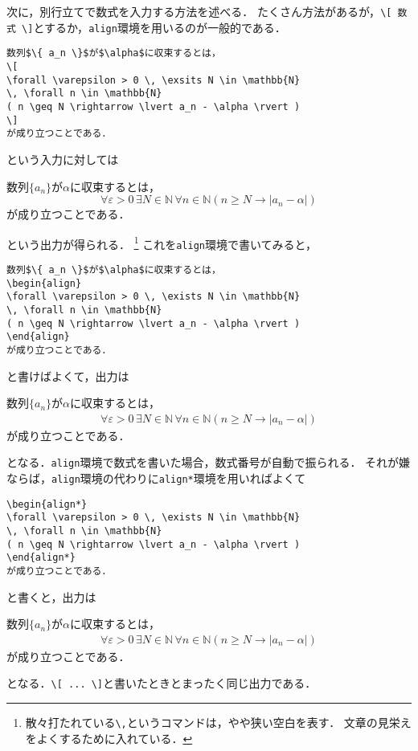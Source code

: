 次に，別行立てで数式を入力する方法を述べる．
たくさん方法があるが，\verb|\[ 数式 \]|とするか，\texttt{align}環境を用いるのが一般的である．
\begin{verbatim}
数列$\{ a_n \}$が$\alpha$に収束するとは，
\[
\forall \varepsilon > 0 \, \exsits N \in \mathbb{N} 
\, \forall n \in \mathbb{N} 
( n \geq N \rightarrow \lvert a_n - \alpha \rvert )
\]
が成り立つことである．
\end{verbatim}
という入力に対しては
\begin{oframed}
数列$\{ a_n \}$が$\alpha$に収束するとは，
\[
\forall \varepsilon > 0 \, \exists N \in \mathbb{N} 
\, \forall n \in \mathbb{N} 
( n \geq N \rightarrow \lvert a_n - \alpha \rvert )
\]
が成り立つことである．
\end{oframed}
という出力が得られる．
\footnote{散々打たれている\verb|\,|というコマンドは，やや狭い空白を表す．
文章の見栄えをよくするために入れている．}
これを\texttt{align}環境で書いてみると，
\begin{verbatim}
数列$\{ a_n \}$が$\alpha$に収束するとは，
\begin{align}
\forall \varepsilon > 0 \, \exists N \in \mathbb{N} 
\, \forall n \in \mathbb{N} 
( n \geq N \rightarrow \lvert a_n - \alpha \rvert )
\end{align}
が成り立つことである．
\end{verbatim}
と書けばよくて，出力は
\begin{oframed}
数列$\{ a_n \}$が$\alpha$に収束するとは，
\begin{align}
\forall \varepsilon > 0 \, \exists N \in \mathbb{N} 
\, \forall n \in \mathbb{N} 
( n \geq N \rightarrow \lvert a_n - \alpha \rvert )
\end{align}
が成り立つことである．
\end{oframed}
となる．\texttt{align}環境で数式を書いた場合，数式番号が自動で振られる．
それが嫌ならば，\texttt{align}環境の代わりに\texttt{align*}環境を用いればよくて
\begin{verbatim}
\begin{align*}
\forall \varepsilon > 0 \, \exists N \in \mathbb{N} 
\, \forall n \in \mathbb{N} 
( n \geq N \rightarrow \lvert a_n - \alpha \rvert )
\end{align*}
が成り立つことである．
\end{verbatim}
と書くと，出力は
\begin{oframed}
数列$\{ a_n \}$が$\alpha$に収束するとは，
\begin{align*}
\forall \varepsilon > 0 \, \exists N \in \mathbb{N} 
\, \forall n \in \mathbb{N} 
( n \geq N \rightarrow \lvert a_n - \alpha \rvert )
\end{align*}
が成り立つことである．
\end{oframed}
となる．\verb|\[ ... \]|と書いたときとまったく同じ出力である．

